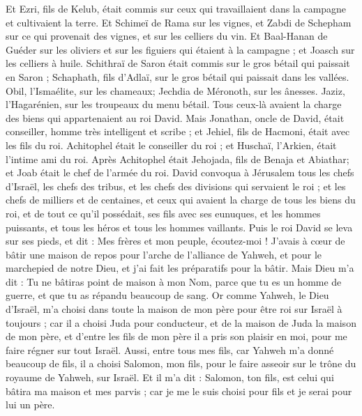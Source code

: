 \begin{multicols}{2}
Et Ezri, fils de Kelub, était commis sur ceux qui travaillaient dans la campagne et cultivaient la terre.
Et Schimeï de Rama sur les vignes, et Zabdi de Schepham sur ce qui provenait des vignes, et sur les celliers du vin.
Et Baal-Hanan de Guéder sur les oliviers et sur les figuiers qui étaient à la campagne ; et Joasch sur les celliers à huile.
Schithraï de Saron était commis sur le gros bétail qui paissait en Saron ; Schaphath, fils d'Adlaï, sur le gros bétail qui paissait dans les vallées.
Obil, l'Ismaélite, sur les chameaux; Jechdia de Méronoth, sur les ânesses.
Jaziz, l'Hagarénien, sur les troupeaux du menu bétail. Tous ceux-là avaient la charge des biens qui appartenaient au roi David.
Mais Jonathan, oncle de David, était conseiller, homme très intelligent et scribe ; et Jehiel, fils de Hacmoni, était avec les fils du roi.
Achitophel était le conseiller du roi ; et Huschaï, l'Arkien, était l'intime ami du roi.
Après Achitophel était Jehojada, fils de Benaja et Abiathar; et Joab était le chef de l'armée du roi.
\VerseOne{}David convoqua à Jérusalem tous les chefs d'Israël, les chefs des tribus, et les chefs des divisions qui servaient le roi ; et les chefs de milliers et de centaines, et ceux qui avaient la charge de tous les biens du roi, et de tout ce qu’il possédait, ses fils avec ses eunuques, et les hommes puissants, et tous les  héros et tous les hommes vaillants.
Puis le roi David se leva sur ses pieds, et dit : Mes frères et mon peuple, écoutez-moi ! J’avais à cœur de bâtir une maison de repos pour l’arche de l'alliance de Yahweh, et pour le marchepied de notre Dieu, et j'ai fait les préparatifs pour la bâtir.
Mais Dieu m'a dit : Tu ne bâtiras point de maison à mon Nom, parce que tu es un homme de guerre, et que tu as répandu beaucoup de sang.
Or comme Yahweh, le Dieu d'Israël, m'a choisi dans toute la maison de mon père pour être roi sur Israël à toujours ; car il a choisi Juda pour conducteur, et de la maison de Juda la maison de mon père, et d'entre les fils de mon père il a pris son plaisir en moi, pour me faire régner sur tout Israël.
Aussi, entre tous mes fils, car Yahweh m'a donné beaucoup de fils, il a choisi Salomon, mon fils, pour le faire asseoir sur le trône du royaume de Yahweh, sur Israël.
Et il m'a dit : Salomon, ton fils, est celui qui bâtira ma maison et mes parvis ; car je me le suis choisi pour fils et je serai pour lui un père.

\end{multicols}
